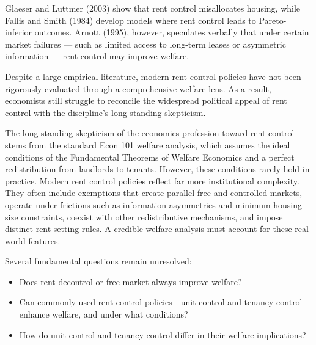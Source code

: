 \documentclass[11pt]{article}
\begin{document}
Glaeser and Luttmer (2003) show that rent control misallocates housing, while Fallis and Smith (1984) develop models where rent control leads to Pareto-inferior outcomes. Arnott (1995), however, speculates verbally that under certain market failures — such as limited access to long-term leases or asymmetric information — rent control may improve welfare.

Despite a large empirical literature, modern rent control policies have not been rigorously evaluated through a comprehensive welfare lens. As a result, economists still struggle to reconcile the widespread political appeal of rent control with the discipline’s long-standing skepticism. 

The long-standing skepticism of the economics profession toward rent control stems from the standard Econ 101 welfare analysis, which assumes the ideal conditions of the Fundamental Theorems of Welfare Economics and a perfect redistribution from landlords to tenants. However, these conditions rarely hold in practice. Modern rent control policies reflect far more institutional complexity. They often include exemptions that create parallel free and controlled markets, operate under frictions such as information asymmetries and minimum housing size constraints, coexist with other redistributive mechanisms, and impose distinct rent-setting rules. A credible welfare analysis must account for these real-world features.

Several fundamental questions remain unresolved:

\begin{itemize}[leftmargin=*]
 \item Does rent decontrol or free market always improve welfare?

 \item Can commonly used rent control policies—unit control and tenancy control—enhance welfare, and under what conditions?

 \item How do unit control and tenancy control differ in their welfare implications?
\end{itemize}
\end{document}
